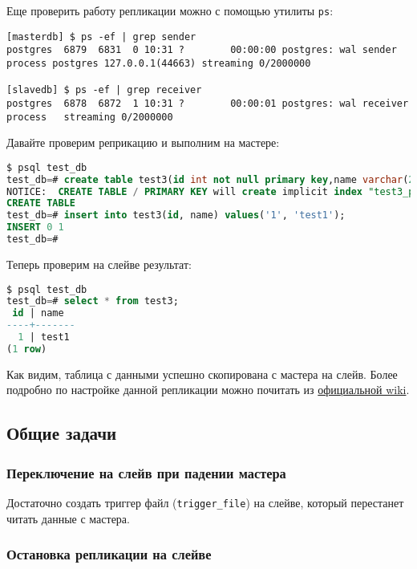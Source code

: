 Еще проверить работу репликации можно с помощью утилиты \lstinline!ps!:

\begin{lstlisting}[label=lst:streaming16,caption=Тестирование репликации]
[masterdb] $ ps -ef | grep sender
postgres  6879  6831  0 10:31 ?        00:00:00 postgres: wal sender process postgres 127.0.0.1(44663) streaming 0/2000000

[slavedb] $ ps -ef | grep receiver
postgres  6878  6872  1 10:31 ?        00:00:01 postgres: wal receiver process   streaming 0/2000000
\end{lstlisting}

Давайте проверим реприкацию и выполним на мастере:

\begin{lstlisting}[language=SQL,label=lst:streaming17,caption=Выполняем на мастере]
$ psql test_db
test_db=# create table test3(id int not null primary key,name varchar(20));
NOTICE:  CREATE TABLE / PRIMARY KEY will create implicit index "test3_pkey" for table "test3"
CREATE TABLE
test_db=# insert into test3(id, name) values('1', 'test1');
INSERT 0 1
test_db=#
\end{lstlisting}

Теперь проверим на слейве результат:

\begin{lstlisting}[language=SQL,label=lst:streaming18,caption=Выполняем на слейве]
$ psql test_db
test_db=# select * from test3;
 id | name
----+-------
  1 | test1
(1 row)
\end{lstlisting}

Как видим, таблица с данными успешно скопирована с мастера на слейв. Более подробно по настройке данной репликации можно почитать из \href{https://wiki.postgresql.org/wiki/Streaming_Replication}{официальной wiki}.

\subsection{Общие задачи}

\subsubsection{Переключение на слейв при падении мастера}

Достаточно создать триггер файл (\lstinline!trigger_file!) на слейве, который перестанет читать данные с мастера.

\subsubsection{Остановка репликации на слейве}

